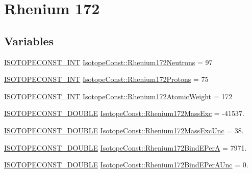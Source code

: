 \hypertarget{group___isotope_const-_rhenium-_re172}{}\section{Rhenium 172}
\label{group___isotope_const-_rhenium-_re172}
\subsection*{Variables}
\begin{DoxyCompactItemize}
\item 
\mbox{\hyperlink{group___isotope_const-_macros_ga5f18360b3e99483a35c32d789e62621c}{I\+S\+O\+T\+O\+P\+E\+C\+O\+N\+S\+T\+\_\+\+I\+NT}} \mbox{\hyperlink{group___isotope_const-_rhenium-_re172_ga698e547ec5a21b47edbe4be39ba39aff}{Isotope\+Const\+::\+Rhenium172\+Neutrons}} = 97
\item 
\mbox{\hyperlink{group___isotope_const-_macros_ga5f18360b3e99483a35c32d789e62621c}{I\+S\+O\+T\+O\+P\+E\+C\+O\+N\+S\+T\+\_\+\+I\+NT}} \mbox{\hyperlink{group___isotope_const-_rhenium-_re172_gaa07c21cee978233a849335e916cf7691}{Isotope\+Const\+::\+Rhenium172\+Protons}} = 75
\item 
\mbox{\hyperlink{group___isotope_const-_macros_ga5f18360b3e99483a35c32d789e62621c}{I\+S\+O\+T\+O\+P\+E\+C\+O\+N\+S\+T\+\_\+\+I\+NT}} \mbox{\hyperlink{group___isotope_const-_rhenium-_re172_ga01cd3f491fcc9c1dd089a01e3f6467a4}{Isotope\+Const\+::\+Rhenium172\+Atomic\+Weight}} = 172
\item 
\mbox{\hyperlink{group___isotope_const-_macros_ga8f45a7272ce02c0b4c65c44636ed719a}{I\+S\+O\+T\+O\+P\+E\+C\+O\+N\+S\+T\+\_\+\+D\+O\+U\+B\+LE}} \mbox{\hyperlink{group___isotope_const-_rhenium-_re172_ga36716a9cc8ba34f2977f0694c99c7227}{Isotope\+Const\+::\+Rhenium172\+Mass\+Exc}} = -\/41537.
\item 
\mbox{\hyperlink{group___isotope_const-_macros_ga8f45a7272ce02c0b4c65c44636ed719a}{I\+S\+O\+T\+O\+P\+E\+C\+O\+N\+S\+T\+\_\+\+D\+O\+U\+B\+LE}} \mbox{\hyperlink{group___isotope_const-_rhenium-_re172_gaf7bcbe5099014206576c891145aa8ef7}{Isotope\+Const\+::\+Rhenium172\+Mass\+Exc\+Unc}} = 38.
\item 
\mbox{\hyperlink{group___isotope_const-_macros_ga8f45a7272ce02c0b4c65c44636ed719a}{I\+S\+O\+T\+O\+P\+E\+C\+O\+N\+S\+T\+\_\+\+D\+O\+U\+B\+LE}} \mbox{\hyperlink{group___isotope_const-_rhenium-_re172_gaac0693e00ed2e09af8efcd5f9b8f5b4c}{Isotope\+Const\+::\+Rhenium172\+Bind\+E\+PerA}} = 7971.
\item 
\mbox{\hyperlink{group___isotope_const-_macros_ga8f45a7272ce02c0b4c65c44636ed719a}{I\+S\+O\+T\+O\+P\+E\+C\+O\+N\+S\+T\+\_\+\+D\+O\+U\+B\+LE}} \mbox{\hyperlink{group___isotope_const-_rhenium-_re172_gaf39e3bcfd6c79bca5f91f6cb075c4eee}{Isotope\+Const\+::\+Rhenium172\+Bind\+E\+Per\+A\+Unc}} = 0.

\end{DoxyCompactItemize}
